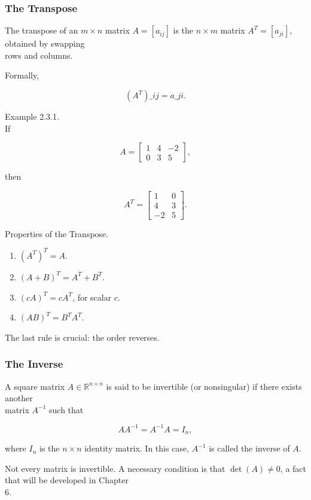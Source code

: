 \documentclass[
  12pt,
  a4paper,
]{article}
\begin{document}
\subsubsection{The Transpose}\label{the-transpose}

The transpose of an \(m \times n\) matrix \(A = [a_{ij}]\) is the
\(n \times m\) matrix \(A^T = [a_{ji}]\), obtained by swapping\\
rows and columns.

Formally,

\[(A^T)\_{ij} = a\_{ji}.\]

Example 2.3.1.\\
If

\[A = \begin{bmatrix}
1 & 4 & -2 \\
0 & 3 & 5
\end{bmatrix},\]

then

\[A^T = \begin{bmatrix}
1 & 0 \\
4 & 3 \\
-2 & 5
\end{bmatrix}.\]

Properties of the Transpose.

\begin{enumerate}
\def\labelenumi{\arabic{enumi}.}
\item
  \((A^T)^T = A\).
\item
  \((A+B)^T = A^T + B^T\).
\item
  \((cA)^T = cA^T\), for scalar \(c\).
\item
  \((AB)^T = B^T A^T\).
\end{enumerate}

The last rule is crucial: the order reverses.

\subsubsection{The Inverse}\label{the-inverse}

A square matrix \(A \in \mathbb{R}^{n \times n}\) is said to be
invertible (or nonsingular) if there exists another\\
matrix \(A^{-1}\) such that

\[AA^{-1} = A^{-1}A = I_n,\]

where \(I_n\) is the \(n \times n\) identity matrix. In this case,
\(A^{-1}\) is called the inverse of \(A\).

Not every matrix is invertible. A necessary condition is that
\(\det(A) \neq 0\), a fact that will be developed in Chapter\\
6.
\end{document}
